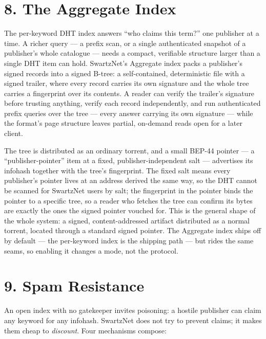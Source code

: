 \documentclass[11pt]{article}
\begin{document}
\hypertarget{the-aggregate-index}{%
\section{8. The Aggregate Index}\label{the-aggregate-index}}

The per-keyword DHT index answers ``who claims this term?'' one
publisher at a time. A richer query --- a prefix scan, or a single
authenticated snapshot of a publisher's whole catalogue --- needs a
compact, verifiable structure larger than a single DHT item can hold.
SwartzNet's Aggregate index packs a publisher's signed records into a
signed B-tree: a self-contained, deterministic file with a signed
trailer, where every record carries its own signature and the whole tree
carries a fingerprint over its contents. A reader can verify the
trailer's signature before trusting anything, verify each record
independently, and run authenticated prefix queries over the tree ---
every answer carrying its own signature --- while the format's page
structure leaves partial, on-demand reads open for a later client.

The tree is distributed as an ordinary torrent, and a small BEP-44
pointer --- a ``publisher-pointer'' item at a fixed,
publisher-independent salt --- advertises its infohash together with the
tree's fingerprint. The fixed salt means every publisher's pointer lives
at an address derived the same way, so the DHT cannot be scanned for
SwartzNet users by salt; the fingerprint in the pointer binds the
pointer to a specific tree, so a reader who fetches the tree can confirm
its bytes are exactly the ones the signed pointer vouched for. This is
the general shape of the whole system: a signed, content-addressed
artifact distributed as a normal torrent, located through a standard
signed pointer. The Aggregate index ships off by default --- the
per-keyword index is the shipping path --- but rides the same seams, so
enabling it changes a mode, not the protocol.

\hypertarget{spam-resistance}{%
\section{9. Spam Resistance}\label{spam-resistance}}

An open index with no gatekeeper invites poisoning: a hostile publisher
can claim any keyword for any infohash. SwartzNet does not try to
prevent claims; it makes them cheap to \emph{discount}. Four mechanisms
compose:
\end{document}
